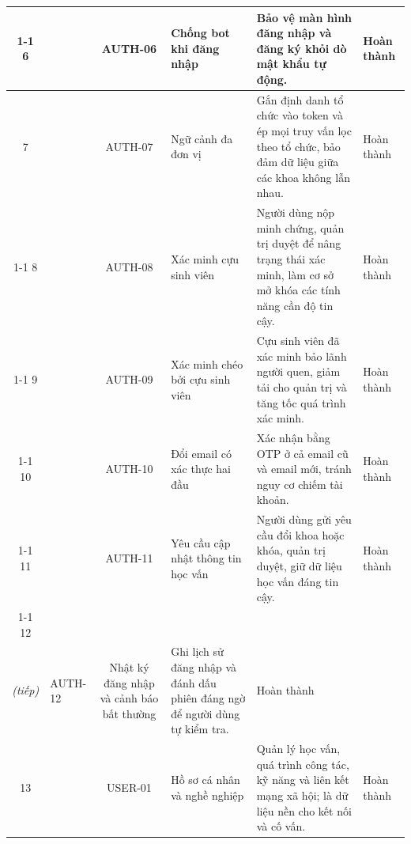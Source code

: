 \documentclass[12pt,a4paper,oneside]{report}
\begin{document}
\begin{landscape}
\begin{longtable}{|c|>{\raggedright\arraybackslash}p{3.1cm}|c|>{\raggedright\arraybackslash}p{4.6cm}|>{\raggedright\arraybackslash}p{8.4cm}|>{\raggedright\arraybackslash}p{2.4cm}|}
\cline{1-1}\cline{3-6}
\cellcolor{oldrow}6 & \multirow{-6}{2.4cm}{\cellcolor{oldrow}\textbf{Xác thực, phân quyền}} & \cellcolor{oldrow}AUTH-06 & \cellcolor{oldrow}Chống bot khi đăng nhập & \cellcolor{oldrow}Bảo vệ màn hình đăng nhập và đăng ký khỏi dò mật khẩu tự động. & \cellcolor{oldrow}Hoàn thành \\
\hline
\cellcolor{oldrow}7 & \cellcolor{oldrow} & \cellcolor{oldrow}AUTH-07 & \cellcolor{oldrow}Ngữ cảnh đa đơn vị & \cellcolor{oldrow}Gắn định danh tổ chức vào token và ép mọi truy vấn lọc theo tổ chức, bảo đảm dữ liệu giữa các khoa không lẫn nhau. & \cellcolor{oldrow}Hoàn thành \\
\cline{1-1}\cline{3-6}
\cellcolor{oldrow}8 & \cellcolor{oldrow} & \cellcolor{oldrow}AUTH-08 & \cellcolor{oldrow}Xác minh cựu sinh viên & \cellcolor{oldrow}Người dùng nộp minh chứng, quản trị duyệt để nâng trạng thái xác minh, làm cơ sở mở khóa các tính năng cần độ tin cậy. & \cellcolor{oldrow}Hoàn thành \\
\cline{1-1}\cline{3-6}
\cellcolor{oldrow}9 & \cellcolor{oldrow} & \cellcolor{oldrow}AUTH-09 & \cellcolor{oldrow}Xác minh chéo bởi cựu sinh viên & \cellcolor{oldrow}Cựu sinh viên đã xác minh bảo lãnh người quen, giảm tải cho quản trị và tăng tốc quá trình xác minh. & \cellcolor{oldrow}Hoàn thành \\
\cline{1-1}\cline{3-6}
\cellcolor{oldrow}10 & \cellcolor{oldrow} & \cellcolor{oldrow}AUTH-10 & \cellcolor{oldrow}Đổi email có xác thực hai đầu & \cellcolor{oldrow}Xác nhận bằng OTP ở cả email cũ và email mới, tránh nguy cơ chiếm tài khoản. & \cellcolor{oldrow}Hoàn thành \\
\cline{1-1}\cline{3-6}
\cellcolor{oldrow}11 & \cellcolor{oldrow} & \cellcolor{oldrow}AUTH-11 & \cellcolor{oldrow}Yêu cầu cập nhật thông tin học vấn & \cellcolor{oldrow}Người dùng gửi yêu cầu đổi khoa hoặc khóa, quản trị duyệt, giữ dữ liệu học vấn đáng tin cậy. & \cellcolor{oldrow}Hoàn thành \\
\cline{1-1}\cline{3-6}
\cellcolor{oldrow}12 & \multirow{-6}{2.4cm}{\cellcolor{oldrow}\textbf{Xác thực, phân quyền\\\textit{(tiếp)}}} & \cellcolor{oldrow}AUTH-12 & \cellcolor{oldrow}Nhật ký đăng nhập và cảnh báo bất thường & \cellcolor{oldrow}Ghi lịch sử đăng nhập và đánh dấu phiên đáng ngờ để người dùng tự kiểm tra. & \cellcolor{oldrow}Hoàn thành \\
\hline
\cellcolor{oldrow}13 & \cellcolor{oldrow} & \cellcolor{oldrow}USER-01 & \cellcolor{oldrow}Hồ sơ cá nhân và nghề nghiệp & \cellcolor{oldrow}Quản lý học vấn, quá trình công tác, kỹ năng và liên kết mạng xã hội; là dữ liệu nền cho kết nối và cố vấn. & \cellcolor{oldrow}Hoàn thành \\

\end{longtable}
\end{landscape}
\end{document}
